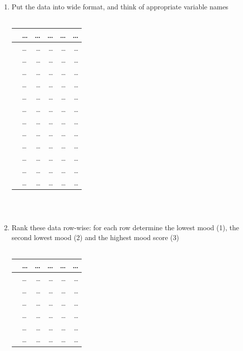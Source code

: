\documentclass[]{book}\usepackage[]{graphicx}\usepackage[]{color}
\begin{document}
\begin{enumerate}

\item Put the data into wide format, and think of appropriate variable names
\\
 \\
 \begin{tabular}{llrrrr}
   & \dots & \dots  & \dots & \dots  & \dots  \\ \hline
  & \dots & \dots  & \dots & \dots  & \dots  \\
  & \dots & \dots  & \dots & \dots  & \dots  \\
  & \dots & \dots  & \dots & \dots  & \dots  \\
  & \dots & \dots  & \dots & \dots  & \dots  \\
  & \dots & \dots  & \dots & \dots  & \dots  \\
  & \dots & \dots  & \dots & \dots  & \dots  \\
  & \dots & \dots  & \dots & \dots  & \dots  \\
  & \dots & \dots  & \dots & \dots  & \dots  \\
  & \dots & \dots  & \dots & \dots  & \dots  \\
  & \dots & \dots  & \dots & \dots  & \dots  \\
  & \dots & \dots  & \dots & \dots  & \dots  \\
  & \dots & \dots  & \dots & \dots  & \dots  \\
 \end{tabular}
\\
\\
\item Rank these data row-wise: for each row determine the lowest mood (1), the second lowest mood (2) and the highest mood score (3)
\\
 \\
 \begin{tabular}{llrrrr}
   & \dots & \dots  & \dots & \dots  & \dots  \\ \hline
  & \dots & \dots  & \dots & \dots  & \dots  \\
  & \dots & \dots  & \dots & \dots  & \dots  \\
  & \dots & \dots  & \dots & \dots  & \dots  \\
  & \dots & \dots  & \dots & \dots  & \dots  \\
  & \dots & \dots  & \dots & \dots  & \dots  \\
  & \dots & \dots  & \dots & \dots  & \dots  \\

\end{tabular}
\end{enumerate}
\end{document}
